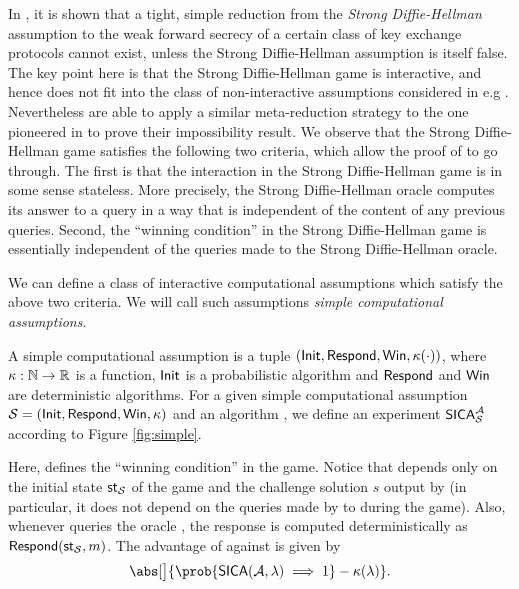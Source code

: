 In , it is shown that a tight, simple reduction from the \emph{Strong Diffie-Hellman} assumption
to the weak forward secrecy of a certain class of key exchange protocols cannot exist,
unless the Strong Diffie-Hellman assumption is itself false.
The key point here is that the Strong Diffie-Hellman game is interactive,
and hence does not fit into the class of non-interactive assumptions considered in e.g .
Nevertheless  are able to apply a similar meta-reduction strategy
to the one pioneered in  to prove their impossibility result.
We observe that the Strong Diffie-Hellman game satisfies the following two criteria,
which allow the proof of  to go through.
The first is that the interaction in the Strong Diffie-Hellman game is in some sense stateless.
More precisely, the Strong Diffie-Hellman oracle computes its answer to a query
in a way that is independent of the content of any previous queries.
Second, the ``winning condition'' in the Strong Diffie-Hellman game is essentially independent of
the queries made to the Strong Diffie-Hellman oracle.

We can define a class of interactive computational assumptions which satisfy the above two criteria.
We will call such assumptions \emph{simple computational assumptions}.

\begin{definition}\label{def:simple}
  A simple computational assumption is a tuple \((\mathsf{Init},\mathsf{Respond},\mathsf{Win},\kappa(\cdot))\),
  where \(\kappa : \mathbb{N} \to \mathbb{R}\) is a function,
  \(\mathsf{Init}\) is a probabilistic algorithm
  and \(\mathsf{Respond}\) and \(\mathsf{Win}\) are deterministic algorithms.
  For a given simple computational assumption \(\mathcal{S} = (\mathsf{Init},\mathsf{Respond},\mathsf{Win},\kappa)\)
  and an algorithm \advA, we define an experiment \(\mathsf{SICA}_{\mathcal{S}}^{\mathcal{A}}\)
  according to Figure \ref{fig:simple}.

  Here, \Win{} defines the ``winning condition'' in the game.
  Notice that \Win{} depends only on the initial state \(\mathsf{st}_{\mathcal{S}}\)
  of the game and the challenge solution \(s\) output by \advA
  (in particular, it does not depend on the queries made by \advA
  to \oracle during the game).
  Also, whenever \advA queries the oracle \oracle,
  the response is computed deterministically as \(\mathsf{Respond}(\mathsf{st}_{\mathcal{S}},m)\).
  The advantage of \advA{} against \Simple is given by
  \begin{equation}
    \abs[\big]{\prob{\SICA(\advA,\lambda) \implies 1} - \kappa(\lambda)}.
  \end{equation}
\end{definition}

